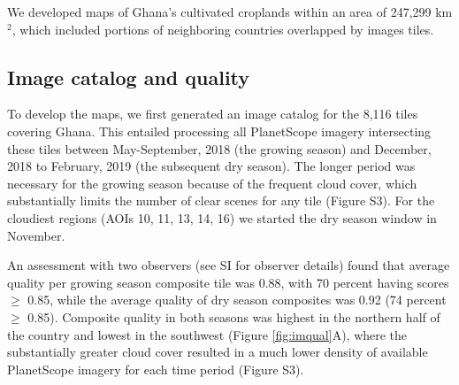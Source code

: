\documentclass[11pt,a4paper]{article}
\begin{document}
We developed maps of Ghana's cultivated croplands within an area of
247,299 km\(^2\), which included portions of neighboring countries
overlapped by images tiles.

\hypertarget{image-catalog-and-quality}{%
\subsection{Image catalog and quality}\label{image-catalog-and-quality}}

To develop the maps, we first generated an image catalog for the 8,116
tiles covering Ghana. This entailed processing all PlanetScope imagery
intersecting these tiles between May-September, 2018 (the growing
season) and December, 2018 to February, 2019 (the subsequent dry
season). The longer period was necessary for the growing season because
of the frequent cloud cover, which substantially limits the number of
clear scenes for any tile (Figure S3). For the cloudiest regions (AOIs
10, 11, 13, 14, 16) we started the dry season window in November.

An assessment with two observers (see SI for observer details) found
that average quality per growing season composite tile was 0.88, with 70
percent having scores \(\geq\) 0.85, while the average quality of dry
season composites was 0.92 (74 percent \(\geq\) 0.85). Composite quality
in both seasons was highest in the northern half of the country and
lowest in the southwest (Figure \ref{fig:imqual}A), where the
substantially greater cloud cover resulted in a much lower density of
available PlanetScope imagery for each time period (Figure S3).
\end{document}
